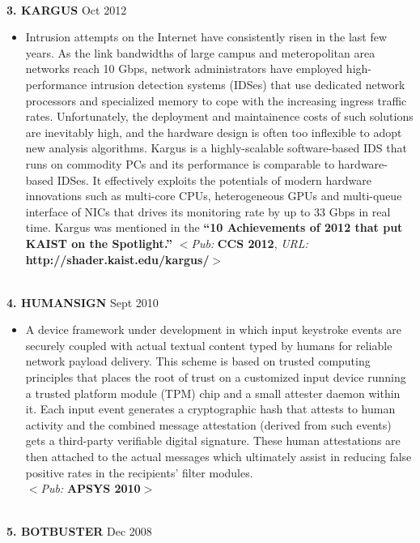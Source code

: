 \documentclass[10pt]{article}
\newenvironment{outerlist}[1][\enskip\textbullet]%
        {\begin{itemize}[#1]}{\end{itemize}%
         \vspace{-.6\baselineskip}}
\begin{document}
\ \\
{\textbf{3. K{\footnotesize ARGUS}}}
        \hfill {Oct 2012}
\begin{outerlist}
\item[] {Intrusion attempts on the Internet have consistently risen in the last few years. As the link bandwidths of large campus and meteropolitan area networks reach 10 Gbps, network administrators have employed high-performance intrusion detection systems (IDSes) that use dedicated network processors and specialized memory to cope with the increasing ingress traffic rates. Unfortunately, the deployment and maintainence costs of such solutions are inevitably high, and the hardware design is often too inflexible to adopt new analysis algorithms. Kargus is a highly-scalable software-based IDS that runs on commodity PCs and its performance is comparable to hardware-based IDSes. It effectively exploits the potentials of modern hardware innovations such as multi-core CPUs, heterogeneous GPUs and multi-queue interface of NICs that drives its monitoring rate by up to 33 Gbps in real time. Kargus was mentioned in the {\bf ``10 Achievements of 2012 that put KAIST on the Spotlight.''} $<$\textit{Pub:} {\bf CCS 2012}, \textit{URL:} {\bf http://shader.kaist.edu/kargus/}$>$}
\end{outerlist}
\ \\
{\textbf{4. H{\footnotesize UMAN}S{\footnotesize IGN}}}
        \hfill {Sept 2010}
\begin{outerlist}
\item[] {A device framework under development in which input keystroke events are securely coupled with actual textual content typed by humans for reliable network payload delivery. This scheme is based on trusted computing principles that places the root of trust on a customized input device running a trusted platform module (TPM) chip and a small attester daemon within it. Each input event generates a cryptographic hash that attests to human activity and the combined message attestation (derived from such events) gets a third-party verifiable digital signature. These human attestations are then attached to the actual messages which ultimately assist in reducing false positive rates in the recipients' filter modules. \\ $<$\textit{Pub:} {\bf APSYS 2010}$>$}
\end{outerlist}
\ \\ 
{\textbf{5. B{\footnotesize OTBUSTER}}}%
	\hfill {Dec 2008}
\end{document}
